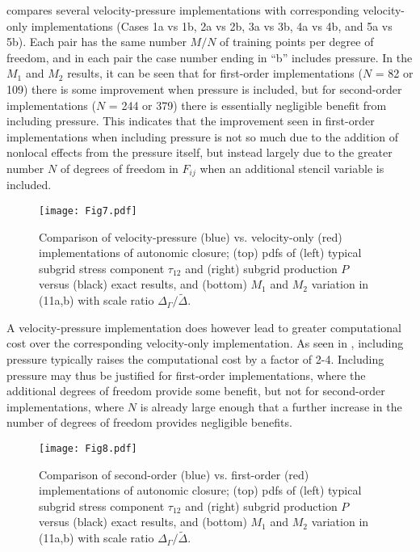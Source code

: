   compares several velocity-pressure implementations with corresponding velocity-only implementations (Cases 1a vs 1b, 2a vs 2b, 3a vs 3b, 4a vs 4b, and 5a vs 5b). Each pair has the same number $M/N$  of training points per degree of freedom, and in each pair the case number ending in “b” includes pressure. In the $M_1$  and $M_2$  results, it can be seen that for first-order implementations ($N$ = 82 or 109) there is some improvement when pressure is included, but for second-order implementations ($N$ = 244 or 379) there is essentially negligible benefit from including pressure. This indicates that the improvement seen in first-order implementations when including pressure is not so much due to the addition of nonlocal effects from the pressure itself, but instead largely due to the greater number $N$ of degrees of freedom in $F_{ij}$  when an additional stencil variable is included. 

%
\begin{figure}
	\begin{center}
	\texttt{[image: Fig7.pdf]}
	\caption{ Comparison of velocity-pressure (blue) vs. velocity-only (red) implementations of autonomic closure; (top) pdfs of (left) typical subgrid stress component $\tau_{12}$ and (right) subgrid production $P$ versus (black) exact results, and (bottom) $M_1$ and $M_2$ variation in (11a,b) with scale ratio $\Delta_{\Gamma}/\widetilde{\Delta}$. }
	\label{F:7}
	\end{center}
\end{figure}
%
%


A velocity-pressure implementation does however lead to greater computational cost over the corresponding velocity-only implementation. As seen in , including pressure typically raises the computational cost by a factor of 2-4. Including pressure may thus be justified for first-order implementations, where the additional degrees of freedom provide some benefit, but not for second-order implementations, where $N$ is already large enough that a further increase in the number of degrees of freedom provides negligible benefits.

%
\begin{figure}
	\begin{center}
	\texttt{[image: Fig8.pdf]}
	\caption{ Comparison of second-order (blue) vs. first-order (red) implementations of autonomic closure; (top) pdfs of (left) typical subgrid stress component $\tau_{12}$ and (right) subgrid production $P$ versus (black) exact results, and (bottom) $M_1$ and $M_2$ variation in (11a,b) with scale ratio $\Delta_{\Gamma}/\widetilde{\Delta}$.}
	\label{F:8}
	\end{center}
\end{figure}
%

